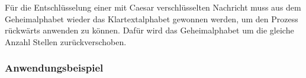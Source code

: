\begin{table}[]
\centering
\caption{Die Generation des Geheimalphabets aus dem Klartextalphabet}
\label{tab:generation-caesar}
\end{table}

Für die Entschlüsselung einer mit Caesar verschlüsselten Nachricht muss aus dem Geheimalphabet wieder das Klartextalphabet gewonnen werden, um den Prozess rückwärts anwenden zu können. Dafür wird das Geheimalphabet um die gleiche Anzahl Stellen zurückverschoben.

\subsubsection{Anwendungsbeispiel}
\label{sec:c-anwendungsbeispiel}

